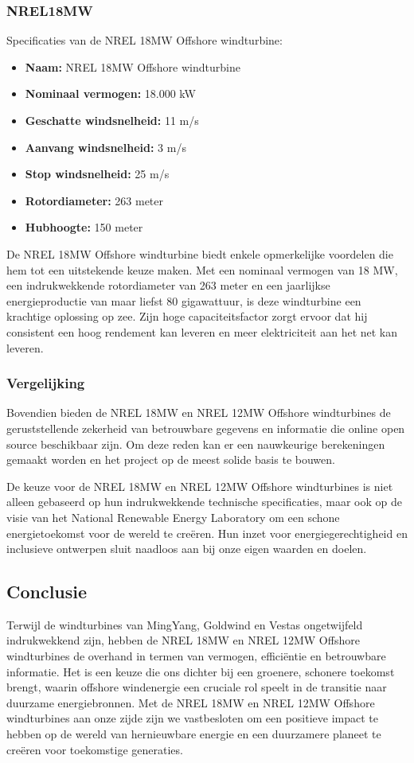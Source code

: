 \subsubsection{NREL18MW}
Specificaties van de NREL 18MW Offshore windturbine:
\begin{itemize}
    \item \textbf{Naam:} NREL 18MW Offshore windturbine
    \item \textbf{Nominaal vermogen:} 18.000 kW
    \item \textbf{Geschatte windsnelheid:} 11 m/s
    \item \textbf{Aanvang windsnelheid:} 3 m/s
    \item \textbf{Stop windsnelheid:} 25 m/s
    \item \textbf{Rotordiameter:} 263 meter
    \item \textbf{Hubhoogte:} 150 meter
\end{itemize}

De NREL 18MW Offshore windturbine biedt enkele opmerkelijke voordelen die hem tot een uitstekende keuze maken. Met een nominaal vermogen van 18 MW, een indrukwekkende rotordiameter van 263 meter en een jaarlijkse energieproductie van maar liefst 80 gigawattuur, is deze windturbine een krachtige oplossing op zee. Zijn hoge capaciteitsfactor zorgt ervoor dat hij consistent een hoog rendement kan leveren en meer elektriciteit aan het net kan leveren.\cite{NRELReference18MW}\cite{NRELCSV18MW}\cite{NRELATB2020Specific}
\subsubsection{Vergelijking}
Bovendien bieden de NREL 18MW en NREL 12MW Offshore windturbines de geruststellende zekerheid van betrouwbare gegevens en informatie die online open source beschikbaar zijn. Om deze reden kan er een nauwkeurige berekeningen gemaakt worden en het project op de meest solide basis te bouwen.\cite{NRELTurbineModels}

De keuze voor de NREL 18MW en NREL 12MW Offshore windturbines is niet alleen gebaseerd op hun indrukwekkende technische specificaties, maar ook op de visie van het National Renewable Energy Laboratory om een schone energietoekomst voor de wereld te creëren. Hun inzet voor energiegerechtigheid en inclusieve ontwerpen sluit naadloos aan bij onze eigen waarden en doelen. \cite{NRELDiversity}\cite{NRELSustainability}\cite{NRELTurbineModels}
\subsection{Conclusie}
Terwijl de windturbines van MingYang, Goldwind en Vestas ongetwijfeld indrukwekkend zijn, hebben de NREL 18MW en NREL 12MW Offshore windturbines de overhand in termen van vermogen, efficiëntie en betrouwbare informatie. Het is een keuze die ons dichter bij een groenere, schonere toekomst brengt, waarin offshore windenergie een cruciale rol speelt in de transitie naar duurzame energiebronnen. Met de NREL 18MW en NREL 12MW Offshore windturbines aan onze zijde zijn we vastbesloten om een positieve impact te hebben op de wereld van hernieuwbare energie en een duurzamere planeet te creëren voor toekomstige generaties.
